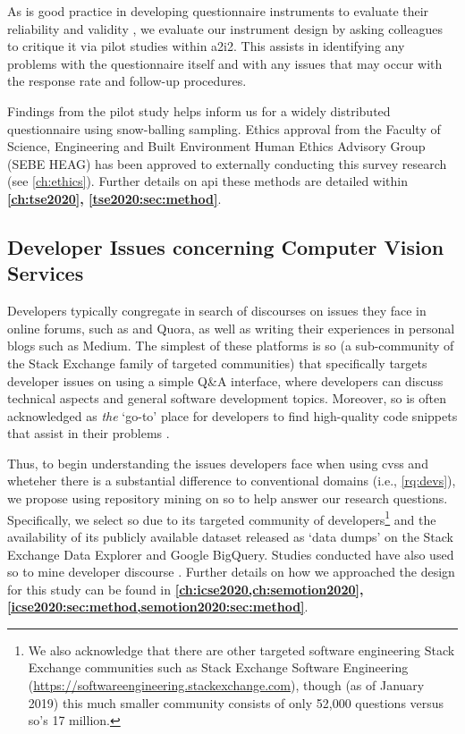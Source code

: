 As is good practice in developing questionnaire instruments to evaluate their reliability and validity \citep{Litwin:1995wt}, we evaluate our instrument design by asking colleagues to critique it via pilot studies within \gls{a2i2}. This assists in identifying any problems with the questionnaire itself and with any issues that may occur with the response rate and follow-up procedures.

Findings from the pilot study helps inform us for a widely distributed questionnaire using snow-balling sampling. Ethics approval from the Faculty of Science, Engineering and Built Environment Human Ethics Advisory Group (SEBE HEAG) has been approved to externally conducting this survey research (see \cref{ch:ethics}). 
Further details on \gls{api} these methods are detailed within \textbf{\cref{ch:tse2020}, \cref{tse2020:sec:method}}.

\subsection{Developer Issues concerning Computer Vision Services}

Developers typically congregate in search of discourses on issues they face in online forums, such as  and Quora, as well as writing their experiences in personal blogs such as Medium. The simplest of these platforms is \gls{so} (a sub-community of the Stack Exchange family of targeted communities) that specifically targets developer issues on using a simple Q\&A interface, where developers can discuss technical aspects and general software development topics. Moreover, \gls{so} is often acknowledged as \textit{the} `go-to' place for developers to find high-quality code snippets that assist in their problems \citep{Subramanian:2014bg}.

Thus, to begin understanding the issues developers face when using \glspl{cvs} and wheteher there is a substantial difference to conventional domains (i.e., \ref{rq:devs}), we propose using repository mining on \gls{so} to help answer our research questions. Specifically, we select \gls{so} due to its targeted community of developers\footnote{We also acknowledge that there are other targeted software engineering Stack Exchange communities such as Stack Exchange Software Engineering (\url{https://softwareengineering.stackexchange.com}), though (as of January 2019) this much smaller community consists of only 52,000 questions versus \gls{so}'s 17 million.} and the availability of its publicly available dataset released as `data dumps' on the Stack Exchange Data Explorer and Google BigQuery. Studies conducted have also used \gls{so} to mine developer discourse \citep{Choi:2015wo,Sinha:2013tt,Novielli:2015vda,Rosen:2016uk,Pal:2012te,Bajaj:2014wg,LinaresVasquez:2014vj,Wang:2013ue,Barua:2012gz,Reboucas:2016tw,Allamanis:2013is,Tahir:2018ks}.
Further details on how we approached the design for this study can be found in \textbf{\cref{ch:icse2020,ch:semotion2020}, \cref{icse2020:sec:method,semotion2020:sec:method}}.


